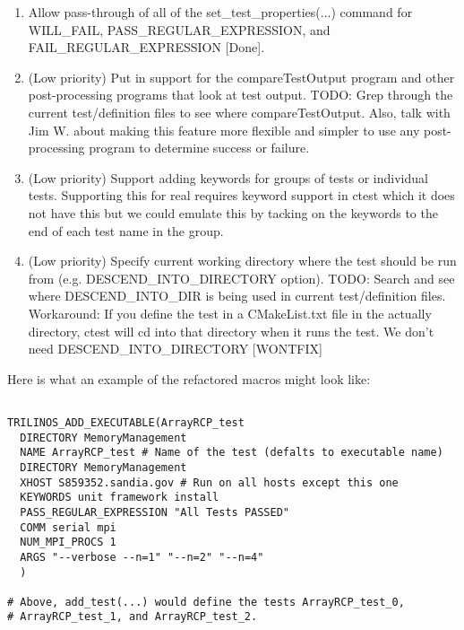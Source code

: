 \documentclass[pdf,ps2pdf,11pt]{SANDreport}
\begin{document}
\begin{enumerate}
\begin{enumerate}
\begin{itemize}
    \end{itemize}

   [Done]

  {}\item Allow pass-through of all of the set\_test\_properties(...) 
  command for WILL\_FAIL, PASS\_REGULAR\_EXPRESSION, and
  FAIL\_REGULAR\_EXPRESSION [Done].

  {}\item (Low priority) Put in support for the compareTestOutput
  program and other post-processing programs that look at test output.
  TODO: Grep through the current test/definition files to see where
  compareTestOutput.  Also, talk with Jim W. about making this feature
  more flexible and simpler to use any post-processing program to
  determine success or failure.

  {}\item (Low priority) Support adding keywords for groups of tests
  or individual tests.  Supporting this for real requires keyword
  support in ctest which it does not have this but we could emulate
  this by tacking on the keywords to the end of each test name in the
  group.

  {}\item (Low priority) Specify current working directory where the
  test should be run from (e.g. DESCEND\_INTO\_DIRECTORY option).
  TODO: Search and see where DESCEND\_INTO\_DIR is being used in
  current test/definition files.  Workaround: If you define the test in
  a CMakeList.txt file in the actually directory, ctest will cd into
  that directory when it runs the test.  We don't need
  DESCEND\_INTO\_DIRECTORY [WONTFIX]

  \end{enumerate}

Here is what an example of the refactored macros might look like:

\begin{verbatim}

TRILINOS_ADD_EXECUTABLE(ArrayRCP_test
  DIRECTORY MemoryManagement
  NAME ArrayRCP_test # Name of the test (defalts to executable name)
  DIRECTORY MemoryManagement
  XHOST S859352.sandia.gov # Run on all hosts except this one
  KEYWORDS unit framework install
  PASS_REGULAR_EXPRESSION "All Tests PASSED"
  COMM serial mpi
  NUM_MPI_PROCS 1
  ARGS "--verbose --n=1" "--n=2" "--n=4"
  )

# Above, add_test(...) would define the tests ArrayRCP_test_0,
# ArrayRCP_test_1, and ArrayRCP_test_2.


\end{verbatim}
\end{enumerate}
\end{document}
